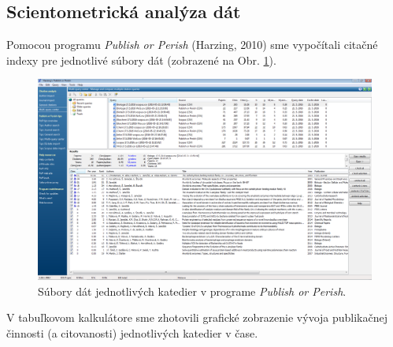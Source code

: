 \subsection{Scientometrická analýza dát}

Pomocou programu \emph{Publish or Perish} (Harzing, 2010) sme vypočítali citačné
indexy pre jednotlivé súbory dát (zobrazené na Obr. \ref{fig:pop.departmentfiles}).

\begin{figure}
  \centering
  \includegraphics[width=\textwidth]{obr/publish-or-perish.jpg}
  \caption{Súbory dát jednotlivých katedier v programe \emph{Publish or Perish}.}
  \label{fig:pop.departmentfiles}
\end{figure}

V tabuľkovom kalkulátore sme zhotovili grafické zobrazenie vývoja publikačnej činnosti
(a citovanosti) jednotlivých katedier v čase.

